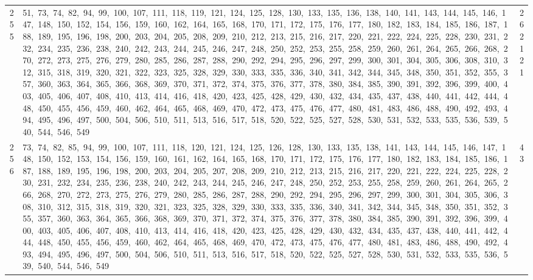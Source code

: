 \begin{longtable}{c|p{}|r}
255 & 51,\ 73,\ 74,\ 82,\ 94,\ 99,\ 100,\ 107,\ 111,\ 118,\ 119,\ 121,\ 124,\ 125,\ 128,\ 130,\ 133,\ 135,\ 136,\ 138,\ 140,\ 141,\ 143,\ 144,\ 145,\ 146,\ 147,\ 148,\ 150,\ 152,\ 154,\ 156,\ 159,\ 160,\ 162,\ 164,\ 165,\ 168,\ 170,\ 171,\ 172,\ 175,\ 176,\ 177,\ 180,\ 182,\ 183,\ 184,\ 185,\ 186,\ 187,\ 188,\ 189,\ 195,\ 196,\ 198,\ 200,\ 203,\ 204,\ 205,\ 208,\ 209,\ 210,\ 212,\ 213,\ 215,\ 216,\ 217,\ 220,\ 221,\ 222,\ 224,\ 225,\ 228,\ 230,\ 231,\ 232,\ 234,\ 235,\ 236,\ 238,\ 240,\ 242,\ 243,\ 244,\ 245,\ 246,\ 247,\ 248,\ 250,\ 252,\ 253,\ 255,\ 258,\ 259,\ 260,\ 261,\ 264,\ 265,\ 266,\ 268,\ 270,\ 272,\ 273,\ 275,\ 276,\ 279,\ 280,\ 285,\ 286,\ 287,\ 288,\ 290,\ 292,\ 294,\ 295,\ 296,\ 297,\ 299,\ 300,\ 301,\ 304,\ 305,\ 306,\ 308,\ 310,\ 312,\ 315,\ 318,\ 319,\ 320,\ 321,\ 322,\ 323,\ 325,\ 328,\ 329,\ 330,\ 333,\ 335,\ 336,\ 340,\ 341,\ 342,\ 344,\ 345,\ 348,\ 350,\ 351,\ 352,\ 355,\ 357,\ 360,\ 363,\ 364,\ 365,\ 366,\ 368,\ 369,\ 370,\ 371,\ 372,\ 374,\ 375,\ 376,\ 377,\ 378,\ 380,\ 384,\ 385,\ 390,\ 391,\ 392,\ 396,\ 399,\ 400,\ 403,\ 405,\ 406,\ 407,\ 408,\ 410,\ 413,\ 414,\ 416,\ 418,\ 420,\ 423,\ 425,\ 428,\ 429,\ 430,\ 432,\ 434,\ 435,\ 437,\ 438,\ 440,\ 441,\ 442,\ 444,\ 448,\ 450,\ 455,\ 456,\ 459,\ 460,\ 462,\ 464,\ 465,\ 468,\ 469,\ 470,\ 472,\ 473,\ 475,\ 476,\ 477,\ 480,\ 481,\ 483,\ 486,\ 488,\ 490,\ 492,\ 493,\ 494,\ 495,\ 496,\ 497,\ 500,\ 504,\ 506,\ 510,\ 511,\ 513,\ 516,\ 517,\ 518,\ 520,\ 522,\ 525,\ 527,\ 528,\ 530,\ 531,\ 532,\ 533,\ 535,\ 536,\ 539,\ 540,\ 544,\ 546,\ 549 & 262121 \\
256 & 73,\ 74,\ 82,\ 85,\ 94,\ 99,\ 100,\ 107,\ 111,\ 118,\ 120,\ 121,\ 124,\ 125,\ 126,\ 128,\ 130,\ 133,\ 135,\ 138,\ 141,\ 143,\ 144,\ 145,\ 146,\ 147,\ 148,\ 150,\ 152,\ 153,\ 154,\ 156,\ 159,\ 160,\ 161,\ 162,\ 164,\ 165,\ 168,\ 170,\ 171,\ 172,\ 175,\ 176,\ 177,\ 180,\ 182,\ 183,\ 184,\ 185,\ 186,\ 187,\ 188,\ 189,\ 195,\ 196,\ 198,\ 200,\ 203,\ 204,\ 205,\ 207,\ 208,\ 209,\ 210,\ 212,\ 213,\ 215,\ 216,\ 217,\ 220,\ 221,\ 222,\ 224,\ 225,\ 228,\ 230,\ 231,\ 232,\ 234,\ 235,\ 236,\ 238,\ 240,\ 242,\ 243,\ 244,\ 245,\ 246,\ 247,\ 248,\ 250,\ 252,\ 253,\ 255,\ 258,\ 259,\ 260,\ 261,\ 264,\ 265,\ 266,\ 268,\ 270,\ 272,\ 273,\ 275,\ 276,\ 279,\ 280,\ 285,\ 286,\ 287,\ 288,\ 290,\ 292,\ 294,\ 295,\ 296,\ 297,\ 299,\ 300,\ 301,\ 304,\ 305,\ 306,\ 308,\ 310,\ 312,\ 315,\ 318,\ 319,\ 320,\ 321,\ 323,\ 325,\ 328,\ 329,\ 330,\ 333,\ 335,\ 336,\ 340,\ 341,\ 342,\ 344,\ 345,\ 348,\ 350,\ 351,\ 352,\ 355,\ 357,\ 360,\ 363,\ 364,\ 365,\ 366,\ 368,\ 369,\ 370,\ 371,\ 372,\ 374,\ 375,\ 376,\ 377,\ 378,\ 380,\ 384,\ 385,\ 390,\ 391,\ 392,\ 396,\ 399,\ 400,\ 403,\ 405,\ 406,\ 407,\ 408,\ 410,\ 413,\ 414,\ 416,\ 418,\ 420,\ 423,\ 425,\ 428,\ 429,\ 430,\ 432,\ 434,\ 435,\ 437,\ 438,\ 440,\ 441,\ 442,\ 444,\ 448,\ 450,\ 455,\ 456,\ 459,\ 460,\ 462,\ 464,\ 465,\ 468,\ 469,\ 470,\ 472,\ 473,\ 475,\ 476,\ 477,\ 480,\ 481,\ 483,\ 486,\ 488,\ 490,\ 492,\ 493,\ 494,\ 495,\ 496,\ 497,\ 500,\ 504,\ 506,\ 510,\ 511,\ 513,\ 516,\ 517,\ 518,\ 520,\ 522,\ 525,\ 527,\ 528,\ 530,\ 531,\ 532,\ 533,\ 535,\ 536,\ 539,\ 540,\ 544,\ 546,\ 549 & 43 \\

\end{longtable}
